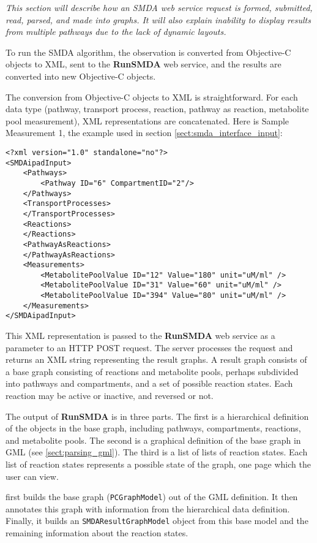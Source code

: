 \emph{This section will describe how an SMDA web service request is formed,
submitted, read, parsed, and made into graphs. It will also explain \mawappp
inability to display results from multiple pathways due to the lack of dynamic
layouts.}

To run the SMDA algorithm, the observation is converted from Objective-C objects
to XML, sent to the \textbf{RunSMDA} web service, and the results are converted
into new Objective-C objects.

The conversion from Objective-C objects to XML is straightforward. For each data
type (pathway, transport process, reaction, pathway as reaction, metabolite
pool measurement), XML representations are concatenated. Here is Sample
Measurement 1, the example used in section \ref{sect:smda_interface_input}:

\begin{lstlisting}
<?xml version="1.0" standalone="no"?>
<SMDAipadInput>
	<Pathways>
		<Pathway ID="6" CompartmentID="2"/>		
	</Pathways>  
	<TransportProcesses>		
	</TransportProcesses>  
	<Reactions>		
	</Reactions>  	
	<PathwayAsReactions>
	</PathwayAsReactions>  	
	<Measurements>
		<MetabolitePoolValue ID="12" Value="180" unit="uM/ml" />
		<MetabolitePoolValue ID="31" Value="60" unit="uM/ml" />
		<MetabolitePoolValue ID="394" Value="80" unit="uM/ml" />
	</Measurements>
</SMDAipadInput>
\end{lstlisting}

This XML representation is passed to the \textbf{RunSMDA} web service as a
parameter to an HTTP POST request. The server processes the request and returns
an XML string representing the result graphs. A result graph consists of a base
graph consisting of reactions and metabolite pools, perhaps subdivided into
pathways and compartments, and a set of possible reaction states. Each reaction
may be active or inactive, and reversed or not.

The output of \textbf{RunSMDA} is in three parts. The first is a hierarchical
definition of the objects in the base graph, including pathways, compartments,
reactions, and metabolite pools. The second is a graphical definition of the
base graph in GML (see \ref{sect:parsing_gml}). The third is a list of lists of
reaction states. Each list of reaction states represents a possible state of the
graph, one page which the user can view.

\mawapp first builds the base graph (\texttt{PCGraphModel}) out of the GML
definition. It then annotates this graph with information from the hierarchical
data definition. Finally, it builds an \texttt{SMDAResultGraphModel} object from
this base model and the remaining information about the reaction states.

